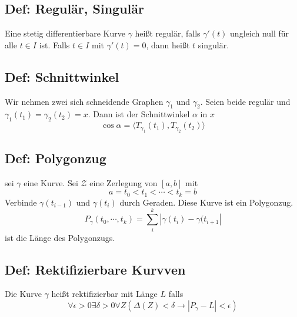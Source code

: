 \subsection{Def: Regulär, Singulär}
Eine stetig differentierbare Kurve $\gamma$ heißt regulär, falls $\gamma'(t)$ ungleich null für alle $t\in I$ ist. Falls $t\in I$ mit $\gamma'(t) = 0$, dann heißt $t$ singulär.

\subsection{Def: Schnittwinkel}
Wir nehmen zwei sich schneidende Graphen $\gamma_1$ und $\gamma_2$. Seien beide regulär und $\gamma_1(t_1) = \gamma_2(t_2) = x$. Dann ist der Schnittwinkel $\alpha$ in $x$
\begin{equation}
	\cos\alpha = \langle T_{\gamma_1}(t_1) , T_{\gamma_2}(t_2)\rangle
\end{equation}

\subsection{Def: Polygonzug}
sei $\gamma$ eine Kurve. Sei $\mathcal Z$ eine Zerlegung von $[a,b]$ mit 
\begin{equation}
	a = t_0 < t_1 < \cdots < t_k = b
\end{equation}
Verbinde $\gamma(t_{i-1})$ und $\gamma(t_i)$ durch Geraden. Diese Kurve ist ein Polygonzug.
\begin{equation}
	P_\gamma(t_0,\cdots,t_k) = \sum_i^k |\gamma(t_i) - \gamma(t_{i+1}|
\end{equation}
ist die Länge des Polygonzugs.

\subsection{Def: Rektifizierbare Kurvven}
Die Kurve $\gamma$ heißt rektifizierbar mit Länge $L$ falls
\begin{equation}
	\forall\epsilon>0\exists\delta>0\forall Z (\Delta(Z) < \delta \rightarrow |P_\gamma - L|<\epsilon)
\end{equation}

